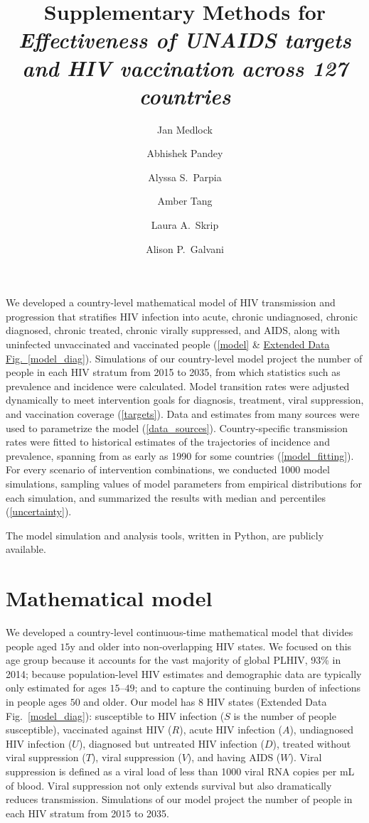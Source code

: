 \documentclass{article}
\title{Supplementary Methods for\\
  \emph{Effectiveness of UNAIDS targets and HIV vaccination across 127
    countries}}
\author{Jan Medlock}
\affil{Department of Biomedical Sciences, Oregon State University, 106
  Dryden Hall, Corvallis, OR, 97331-4801, USA,
  \href{mailto:jan.medlock@oregonstate.edu}
  {\texttt{jan.medlock@oregonstate.edu}}}
\author{Abhishek Pandey} \author{Alyssa S.~Parpia} \author{Amber Tang}
\author{Laura A.~Skrip} \author{Alison P.~Galvani}
\affil{Center for Infectious Disease Modeling and Analysis, Yale
  School of Public Health, 135 College Street, New Haven, USA}
\begin{document}
\maketitle

We developed a country-level mathematical model of HIV transmission
and progression that stratifies HIV infection into acute, chronic
undiagnosed, chronic diagnosed, chronic treated, chronic virally
suppressed, and AIDS, along with uninfected unvaccinated and
vaccinated people (\autoref{model} \&
\hyperref[model_diag]{Extended Data Fig.~\ref*{model_diag}}).
Simulations of our country-level model project the number of people in
each HIV stratum from 2015 to 2035, from which statistics such as
prevalence and incidence were calculated.  Model transition rates were
adjusted dynamically to meet intervention goals for diagnosis,
treatment, viral suppression, and vaccination coverage
(\autoref{targets}).  Data and estimates from many sources were used
to parametrize the model (\autoref{data_sources}).  Country-specific
transmission rates were fitted to historical estimates of the
trajectories of incidence and prevalence, spanning from as early as
1990 for some countries (\autoref{model_fitting}). For every scenario
of intervention combinations, we conducted 1000 model simulations,
sampling values of model parameters from empirical distributions for
each simulation, and summarized the results with median and
percentiles (\autoref{uncertainty}).

The model simulation and analysis tools, written in Python, are
publicly available\cite{medlock2016-git}.


\section{Mathematical model}
\label{model}

We developed a country-level continuous-time mathematical model that
divides people aged $15$\;y and older into non-overlapping HIV states.
We focused on this age group because it accounts for the vast majority
of global PLHIV\cite{UNICEF}, 93\% in 2014; because population-level
HIV estimates and demographic data are typically only estimated for
ages $15$--$49$; and to capture the continuing burden of infections in
people ages $50$ and older.  Our model has 8 HIV states (Extended Data
Fig.~\ref*{model_diag}): susceptible to HIV infection ($S$ is the
number of people susceptible), vaccinated against HIV ($R$), acute HIV
infection ($A$), undiagnosed HIV infection ($U$), diagnosed but
untreated HIV infection ($D$), treated without viral suppression
($T$), viral suppression ($V$), and having AIDS ($W$).  Viral
suppression is defined as a viral load of less than 1000 viral RNA
copies per mL of blood.  Viral suppression not only extends survival
but also dramatically reduces
transmission\cite{vernazza2000, ioannidis2001, attia2009, May2014-gp}.
Simulations of our model project the number of people in each HIV
stratum from 2015 to 2035.
\end{document}
